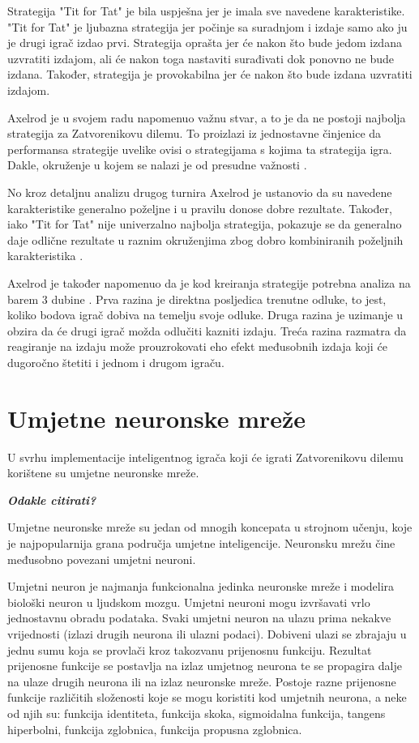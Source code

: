 \documentclass[zavrsnirad]{fer}
\begin{document}
		Strategija "Tit for Tat" je bila uspješna jer je imala sve navedene karakteristike. "Tit for Tat" je ljubazna strategija jer počinje sa suradnjom i izdaje samo ako ju je drugi igrač izdao prvi. Strategija oprašta jer će nakon što bude jedom izdana uzvratiti izdajom, ali će nakon toga nastaviti surađivati dok ponovno ne bude izdana. Također, strategija je provokabilna jer će nakon što bude izdana uzvratiti izdajom.
	
		Axelrod je u svojem radu napomenuo važnu stvar, a to je da ne postoji najbolja strategija za Zatvorenikovu dilemu. To proizlazi iz jednostavne činjenice da performansa strategije uvelike ovisi o strategijama s kojima ta strategija igra. Dakle, okruženje u kojem se nalazi je od presudne važnosti \cite{1980Axelrod1}.
	
		No kroz detaljnu analizu drugog turnira Axelrod je ustanovio da su navedene karakteristike generalno poželjne i u pravilu donose dobre rezultate. Također, iako "Tit for Tat" nije univerzalno najbolja strategija, pokazuje se da generalno daje odlične rezultate u raznim okruženjima zbog dobro kombiniranih poželjnih karakteristika \cite{1980Axelrod2}.
	
		Axelrod je također napomenuo da je kod kreiranja strategije potrebna analiza na barem 3 dubine \cite{1980Axelrod1}. Prva razina je direktna posljedica trenutne odluke, to jest, koliko bodova igrač dobiva na temelju svoje odluke. Druga razina je uzimanje u obzira da će drugi igrač možda odlučiti kazniti izdaju. Treća razina razmatra da reagiranje na izdaju može prouzrokovati eho efekt međusobnih izdaja koji će dugoročno štetiti i jednom i drugom igraču.

\chapter{Umjetne neuronske mreže}

	U svrhu implementacije inteligentnog igrača koji će igrati Zatvorenikovu dilemu korištene su umjetne neuronske mreže.
	
	\textit{\textbf{Odakle citirati?}}
	
	Umjetne neuronske mreže su jedan od mnogih koncepata u strojnom učenju, koje je najpopularnija grana područja umjetne inteligencije. Neuronsku mrežu čine međusobno povezani umjetni neuroni. 
	
	Umjetni neuron je najmanja funkcionalna jedinka neuronske mreže i modelira biološki neuron u ljudskom mozgu. Umjetni neuroni mogu izvršavati vrlo jednostavnu obradu podataka. Svaki umjetni neuron na ulazu prima nekakve vrijednosti (izlazi drugih neurona ili ulazni podaci). Dobiveni ulazi se zbrajaju u jednu sumu koja se provlači kroz takozvanu prijenosnu funkciju. Rezultat prijenosne funkcije se postavlja na izlaz umjetnog neurona te se propagira dalje na ulaze drugih neurona ili na izlaz neuronske mreže. Postoje razne prijenosne funkcije različitih složenosti koje se mogu koristiti kod umjetnih neurona, a neke od njih su: funkcija identiteta, funkcija skoka, sigmoidalna funkcija, tangens hiperbolni, funkcija zglobnica, funkcija propusna zglobnica.
\end{document}
